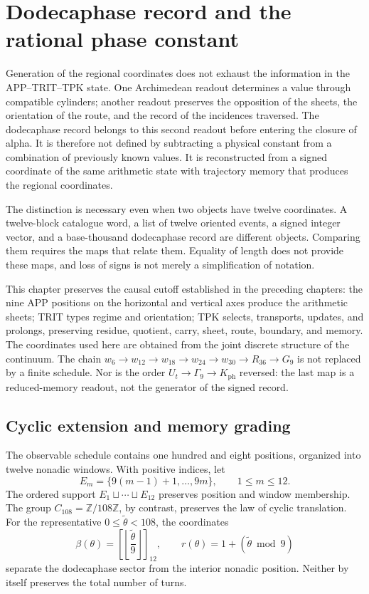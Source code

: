 \section{Dodecaphase record and the rational phase constant}
\label{sec:k-registro}

Generation of the regional coordinates does not exhaust the information in the
APP--TRIT--TPK state. One Archimedean readout determines a value through
compatible cylinders; another readout preserves the opposition of the sheets,
the orientation of the route, and the record of the incidences traversed. The
dodecaphase record belongs to this second readout before entering
the closure of alpha. It is therefore not defined by subtracting a physical constant from
a combination of previously known values. It is reconstructed from a
signed coordinate of the same arithmetic state with trajectory memory that produces the regional
coordinates.

The distinction is necessary even when two objects have twelve
coordinates. A twelve-block catalogue word, a list of twelve
oriented events, a signed integer vector, and a base-thousand dodecaphase record are
different objects. Comparing them requires the maps that
relate them. Equality of length does not provide these maps, and
loss of signs is not merely a simplification of notation.

This chapter preserves the causal cutoff established in the preceding chapters:
the nine APP positions on the horizontal and vertical axes produce the
arithmetic sheets; TRIT types regime and orientation; TPK selects,
transports, updates, and prolongs, preserving residue, quotient, carry,
sheet, route, boundary, and memory. The coordinates used here are obtained
from the joint discrete structure of the continuum. The chain
\(w_6\to w_{12}\to w_{18}\to w_{24}\to w_{30}\to R_{36}\to G_9\)
is not replaced by a finite schedule. Nor is the order
\(U_t\to\Gamma_9\to K_{\mathrm{ph}}\) reversed: the last map is a
reduced-memory readout, not the generator of the signed record.



\subsection{Cyclic extension and memory grading}
\label{subsec:k-calendario}

The observable schedule contains one hundred and eight positions, organized into
twelve nonadic windows. With positive indices, let
\[
 E_m=\{9(m-1)+1,\ldots,9m\},\qquad 1\leq m\leq12.
\]
The ordered support \(E_1\sqcup\cdots\sqcup E_{12}\) preserves position and
window membership. The group \(C_{108}=\mathbb Z/108\mathbb Z\),
by contrast, preserves the law of cyclic translation. For the representative
\(0\leq\widetilde\theta<108\), the coordinates
\[
 \beta(\theta)=\left[\left\lfloor\frac{\widetilde\theta}{9}\right\rfloor\right]_{12},
 \qquad r(\theta)=1+(\widetilde\theta\bmod9)
\]
separate the dodecaphase sector from the interior nonadic position. Neither
by itself preserves the total number of turns.

